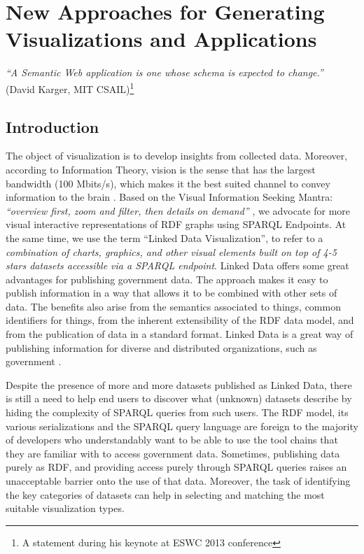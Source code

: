 \chapter{New Approaches for Generating Visualizations and Applications}
\label{ch:ch5}

\begin{flushright}
\textit{``A Semantic Web application is one whose schema is expected to change.''} \\ (David Karger, MIT CSAIL)\footnote{A statement during his keynote at ESWC 2013 conference}
\end{flushright}


\section*{Introduction}
\label{sec:introch5}
The object of visualization is to develop insights from collected data. Moreover, according to Information Theory, vision is the sense that has the largest bandwidth (100 Mbits/s), which makes it the best suited channel to convey information to the brain \cite{Ware:2014}. Based on the Visual Information Seeking Mantra: \textit{``overview first, zoom and filter, then details on demand''} \cite{Shneiderman99}, we advocate for more visual interactive representations of RDF graphs using SPARQL Endpoints.   At the same time,  we use the term ``Linked Data Visualization'', to refer to a \textit{combination of charts, graphics, and other visual elements built on top of 4-5 stars datasets accessible via a SPARQL endpoint}. 
Linked Data offers some great advantages for publishing government data. The approach makes it easy to publish information in a way that allows it to be combined with other sets of data. The benefits also arise from the semantics associated to things, common identifiers for things, from the inherent extensibility of the RDF data model, and from the publication of data in a standard format. Linked Data is a great way of publishing information for diverse and distributed organizations, such as government \cite{tennison10}.

Despite the presence of more and more datasets published as Linked Data, there is still a need to help end users to discover what (unknown) datasets describe by hiding the complexity of SPARQL queries from such users. The RDF model, its various serializations and the SPARQL query language are foreign to the majority of developers who understandably want to be able to use the tool chains that they are familiar with to access government data. Sometimes, publishing data purely as RDF, and providing access purely through SPARQL queries raises an unacceptable barrier onto the use of that data. Moreover, the task of identifying the key categories of datasets can help in selecting and matching the most suitable visualization types.

